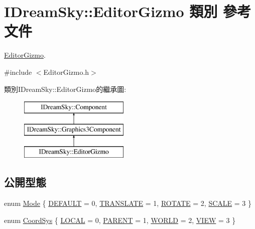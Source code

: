 \hypertarget{class_i_dream_sky_1_1_editor_gizmo}{}\section{I\+Dream\+Sky\+:\+:Editor\+Gizmo 類別 參考文件}
\label{class_i_dream_sky_1_1_editor_gizmo}


\hyperlink{class_i_dream_sky_1_1_editor_gizmo}{Editor\+Gizmo}.  




{\ttfamily \#include $<$Editor\+Gizmo.\+h$>$}

類別\+I\+Dream\+Sky\+:\+:Editor\+Gizmo的繼承圖\+:\begin{figure}[H]
\begin{center}
\leavevmode
\includegraphics[height=3.000000cm]{class_i_dream_sky_1_1_editor_gizmo}
\end{center}
\end{figure}
\subsection*{公開型態}
\begin{DoxyCompactItemize}
\item 
enum \hyperlink{class_i_dream_sky_1_1_editor_gizmo_ac4d72bcb586f548ceaba02af53340394}{Mode} \{ \hyperlink{class_i_dream_sky_1_1_editor_gizmo_ac4d72bcb586f548ceaba02af53340394a344cfdda6e113c3ecf8748b990aa21ff}{D\+E\+F\+A\+U\+LT} = 0, 
\hyperlink{class_i_dream_sky_1_1_editor_gizmo_ac4d72bcb586f548ceaba02af53340394acef76e8596a49483fb71426c254e7002}{T\+R\+A\+N\+S\+L\+A\+TE} = 1, 
\hyperlink{class_i_dream_sky_1_1_editor_gizmo_ac4d72bcb586f548ceaba02af53340394a77f441f62efafabfd92646b92ed7660b}{R\+O\+T\+A\+TE} = 2, 
\hyperlink{class_i_dream_sky_1_1_editor_gizmo_ac4d72bcb586f548ceaba02af53340394af89b494dcddd3e8799518096f5e8423f}{S\+C\+A\+LE} = 3
 \}
\item 
enum \hyperlink{class_i_dream_sky_1_1_editor_gizmo_a907a83f34db5629458b5c1da4d13f35f}{Coord\+Sys} \{ \hyperlink{class_i_dream_sky_1_1_editor_gizmo_a907a83f34db5629458b5c1da4d13f35faf463a519ae9c08322ff77658ef46b121}{L\+O\+C\+AL} = 0, 
\hyperlink{class_i_dream_sky_1_1_editor_gizmo_a907a83f34db5629458b5c1da4d13f35fabccdf6b485bf7ad39b1c79c38733886f}{P\+A\+R\+E\+NT} = 1, 
\hyperlink{class_i_dream_sky_1_1_editor_gizmo_a907a83f34db5629458b5c1da4d13f35fa67cd98fc308c56cae381fdc2fa2c3ff7}{W\+O\+R\+LD} = 2, 
\hyperlink{class_i_dream_sky_1_1_editor_gizmo_a907a83f34db5629458b5c1da4d13f35fab2be228099a12ea64338a643ba016bd2}{V\+I\+EW} = 3
 \}
\end{DoxyCompactItemize}
